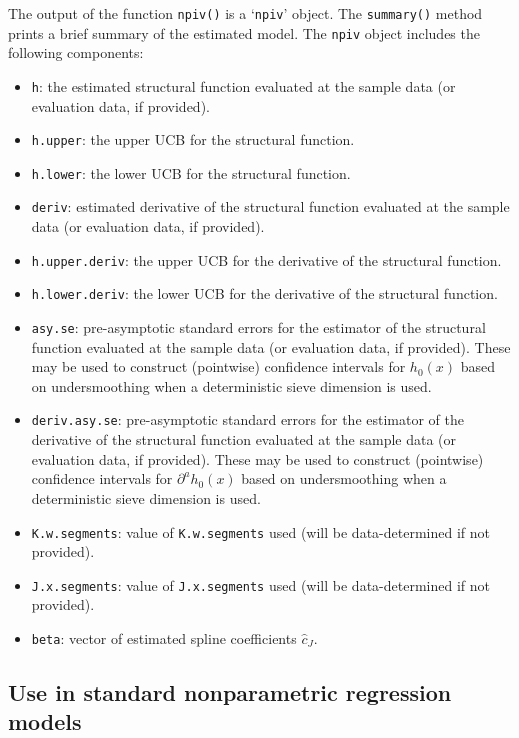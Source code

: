 \documentclass[
]{jss}
\begin{document}
The output of the function \texttt{npiv()} is a `\texttt{npiv}' object.
The \texttt{summary()} method prints a brief summary of the estimated
model. The \texttt{npiv} object includes the following components:

\begin{itemize}
\item
  \texttt{h}: the estimated structural function evaluated at the sample
  data (or evaluation data, if provided).
\item
  \texttt{h.upper}: the upper UCB for the structural function.
\item
  \texttt{h.lower}: the lower UCB for the structural function.
\item
  \texttt{deriv}: estimated derivative of the structural function
  evaluated at the sample data (or evaluation data, if provided).
\item
  \texttt{h.upper.deriv}: the upper UCB for the derivative of the
  structural function.
\item
  \texttt{h.lower.deriv}: the lower UCB for the derivative of the
  structural function.
\item
  \texttt{asy.se}: pre-asymptotic standard errors for the estimator of
  the structural function evaluated at the sample data (or evaluation
  data, if provided). These may be used to construct (pointwise)
  confidence intervals for \(h_0(x)\) based on undersmoothing when a
  deterministic sieve dimension is used.
\item
  \texttt{deriv.asy.se}: pre-asymptotic standard errors for the
  estimator of the derivative of the structural function evaluated at
  the sample data (or evaluation data, if provided). These may be used
  to construct (pointwise) confidence intervals for
  \(\partial^a h_0(x)\) based on undersmoothing when a deterministic
  sieve dimension is used.
\item
  \texttt{K.w.segments}: value of \texttt{K.w.segments} used (will be
  data-determined if not provided).
\item
  \texttt{J.x.segments}: value of \texttt{J.x.segments} used (will be
  data-determined if not provided).
\item
  \texttt{beta}: vector of estimated spline coefficients \(\hat c_J\).
\end{itemize}

\hypertarget{use-in-standard-nonparametric-regression-models}{%
\subsection{Use in standard nonparametric regression
models}\label{use-in-standard-nonparametric-regression-models}}
\end{document}
